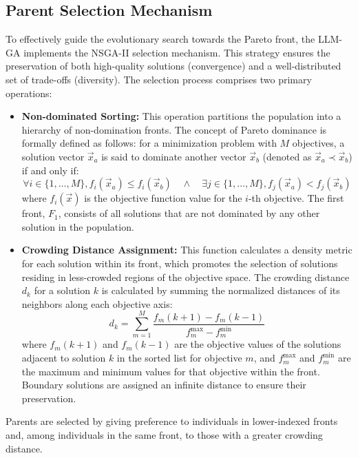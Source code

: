 \documentclass[preprint,12pt]{elsarticle}
\begin{document}
\subsection{Parent Selection Mechanism}
To effectively guide the evolutionary search towards the Pareto front, the LLM-GA implements the NSGA-II selection mechanism. This strategy ensures the preservation of both high-quality solutions (convergence) and a well-distributed set of trade-offs (diversity). The selection process comprises two primary operations:
\begin{itemize}
    \item \textbf{Non-dominated Sorting:} This operation partitions the population into a hierarchy of non-domination fronts. The concept of Pareto dominance is formally defined as follows: for a minimization problem with $M$ objectives, a solution vector $\vec{x}_a$ is said to dominate another vector $\vec{x}_b$ (denoted as $\vec{x}_a \prec \vec{x}_b$) if and only if:
    \begin{equation}
        \forall i \in \{1, \dots, M\}, f_i(\vec{x}_a) \leq f_i(\vec{x}_b) \quad \land \quad \exists j \in \{1, \dots, M\}, f_j(\vec{x}_a) < f_j(\vec{x}_b)
    \end{equation}
    where $f_i(\vec{x})$ is the objective function value for the $i$-th objective. The first front, $F_1$, consists of all solutions that are not dominated by any other solution in the population.

    \item \textbf{Crowding Distance Assignment:} This function calculates a density metric for each solution within its front, which promotes the selection of solutions residing in less-crowded regions of the objective space. The crowding distance $d_k$ for a solution $k$ is calculated by summing the normalized distances of its neighbors along each objective axis:
    \begin{equation}
        d_k = \sum_{m=1}^{M} \frac{f_m(k+1) - f_m(k-1)}{f_m^{\text{max}} - f_m^{\text{min}}}
    \end{equation}
    where $f_m(k+1)$ and $f_m(k-1)$ are the objective values of the solutions adjacent to solution $k$ in the sorted list for objective $m$, and $f_m^{\text{max}}$ and $f_m^{\text{min}}$ are the maximum and minimum values for that objective within the front. Boundary solutions are assigned an infinite distance to ensure their preservation.
\end{itemize}

Parents are selected by giving preference to individuals in lower-indexed fronts and, among individuals in the same front, to those with a greater crowding distance.
\end{document}
